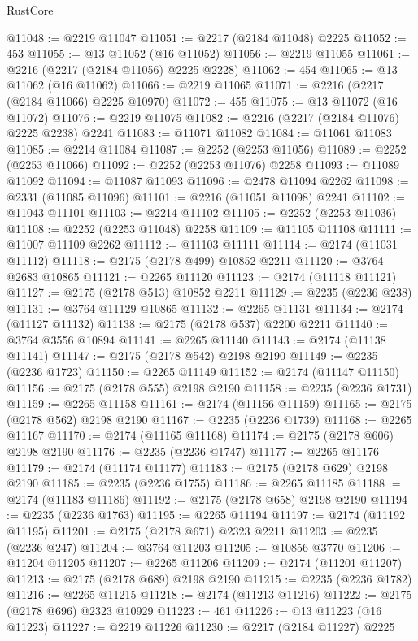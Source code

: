 \begin{lexlean}{RustCore}
\begin{coremodule}
@11048 := @2219 @11047
@11051 := @2217 (@2184 @11048) @2225
@11052 := 453
@11055 := @13 @11052 (@16 @11052)
@11056 := @2219 @11055
@11061 := @2216 (@2217 (@2184 @11056) @2225 @2228)
@11062 := 454
@11065 := @13 @11062 (@16 @11062)
@11066 := @2219 @11065
@11071 := @2216 (@2217 (@2184 @11066) @2225 @10970)
@11072 := 455
@11075 := @13 @11072 (@16 @11072)
@11076 := @2219 @11075
@11082 := @2216 (@2217 (@2184 @11076) @2225 @2238) @2241
@11083 := @11071 @11082
@11084 := @11061 @11083
@11085 := @2214 @11084
@11087 := @2252 (@2253 @11056)
@11089 := @2252 (@2253 @11066)
@11092 := @2252 (@2253 @11076) @2258
@11093 := @11089 @11092
@11094 := @11087 @11093
@11096 := @2478 @11094 @2262
@11098 := @2331 (@11085 @11096)
@11101 := @2216 (@11051 @11098) @2241
@11102 := @11043 @11101
@11103 := @2214 @11102
@11105 := @2252 (@2253 @11036)
@11108 := @2252 (@2253 @11048) @2258
@11109 := @11105 @11108
@11111 := @11007 @11109 @2262
@11112 := @11103 @11111
@11114 := @2174 (@11031 @11112)
@11118 := @2175 (@2178 @499) @10852 @2211
@11120 := @3764 @2683 @10865
@11121 := @2265 @11120
@11123 := @2174 (@11118 @11121)
@11127 := @2175 (@2178 @513) @10852 @2211
@11129 := @2235 (@2236 @238)
@11131 := @3764 @11129 @10865
@11132 := @2265 @11131
@11134 := @2174 (@11127 @11132)
@11138 := @2175 (@2178 @537) @2200 @2211
@11140 := @3764 @3556 @10894
@11141 := @2265 @11140
@11143 := @2174 (@11138 @11141)
@11147 := @2175 (@2178 @542) @2198 @2190
@11149 := @2235 (@2236 @1723)
@11150 := @2265 @11149
@11152 := @2174 (@11147 @11150)
@11156 := @2175 (@2178 @555) @2198 @2190
@11158 := @2235 (@2236 @1731)
@11159 := @2265 @11158
@11161 := @2174 (@11156 @11159)
@11165 := @2175 (@2178 @562) @2198 @2190
@11167 := @2235 (@2236 @1739)
@11168 := @2265 @11167
@11170 := @2174 (@11165 @11168)
@11174 := @2175 (@2178 @606) @2198 @2190
@11176 := @2235 (@2236 @1747)
@11177 := @2265 @11176
@11179 := @2174 (@11174 @11177)
@11183 := @2175 (@2178 @629) @2198 @2190
@11185 := @2235 (@2236 @1755)
@11186 := @2265 @11185
@11188 := @2174 (@11183 @11186)
@11192 := @2175 (@2178 @658) @2198 @2190
@11194 := @2235 (@2236 @1763)
@11195 := @2265 @11194
@11197 := @2174 (@11192 @11195)
@11201 := @2175 (@2178 @671) @2323 @2211
@11203 := @2235 (@2236 @247)
@11204 := @3764 @11203
@11205 := @10856 @3770
@11206 := @11204 @11205
@11207 := @2265 @11206
@11209 := @2174 (@11201 @11207)
@11213 := @2175 (@2178 @689) @2198 @2190
@11215 := @2235 (@2236 @1782)
@11216 := @2265 @11215
@11218 := @2174 (@11213 @11216)
@11222 := @2175 (@2178 @696) @2323 @10929
@11223 := 461
@11226 := @13 @11223 (@16 @11223)
@11227 := @2219 @11226
@11230 := @2217 (@2184 @11227) @2225

\end{coremodule}
\end{lexlean}
